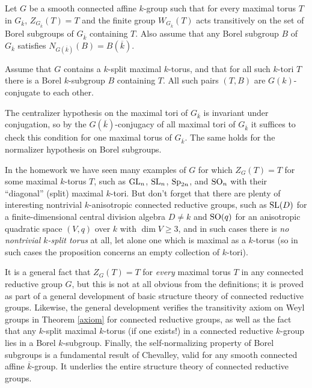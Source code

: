 \documentclass[10pt]{article}
\renewcommand{\(}{\left(}
\renewcommand{\)}{\right)}
\numberwithin{thm}{subsection}
\begin{document}
\begin{thm}\label{axiom} Let $G$ be a smooth connected affine $k$-group such that 
for every maximal torus $T$ in $G_{\overline{k}}$, $Z_{G_{\overline{k}}}(T) = T$
and the finite group $W_{G_{\overline{k}}}(T)$ acts transitively on
the set of Borel subgroups of $G_{\overline{k}}$ containing $T$.  Also assume
that any Borel subgroup $B$ of $G_{\overline{k}}$ satisfies $N_{G(\overline{k})}(B) = B(\overline{k})$.
 
 Assume that $G$ contains a $k$-split maximal $k$-torus, and
 that for all such $k$-tori $T$ 
there is a Borel $k$-subgroup $B$ containing $T$.  All such pairs $(T, B)$ are $G(k)$-conjugate to each other.
\end{thm}

The centralizer hypothesis on the maximal tori of $G_{\overline{k}}$ is invariant under
conjugation, so by the $G(\overline{k})$-conjugacy of all maximal tori of $G_{\overline{k}}$
it suffices to check this condition for one maximal torus of $G_{\overline{k}}$.  The same
holds for the normalizer hypothesis on Borel subgroups.

\begin{remark}
In the homework we have seen many examples of $G$ for which $Z_G(T) = T$ for some
maximal $k$-torus $T$, such as ${\rm{GL}}_n$, ${\rm{SL}}_n$, ${\rm{Sp}}_{2n}$,
and ${\rm{SO}}_n$ with their ``diagonal''  (split) maximal $k$-tori.   But don't forget that there
are plenty of interesting nontrivial $k$-anisotropic connected reductive groups,
such as ${\rm{SL}}(D)$ for a finite-dimensional central division algebra $D \ne k$ and
${\rm{SO}}(q)$ for an anisotropic quadratic space $(V,q)$ over $k$ with $\dim V \ge 3$,
and in such cases there is {\em no nontrivial $k$-split torus} at all, let alone one which is maximal
as a $k$-torus (so in such cases the proposition concerns an empty collection of
$k$-tori).  
\end{remark}

\begin{remark}\label{ver}
 It is a general fact that $Z_G(T) = T$ for {\em every} maximal torus $T$ in any connected
reductive group $G$, but this is not at all obvious from the definitions; it is proved 
as part of a general development of basic structure theory of connected reductive groups.
Likewise, the general development verifies the transitivity axiom on Weyl groups in Theorem \ref{axiom} for connected reductive groups,
as well as the fact that any $k$-split maximal $k$-torus (if one exists!) in a connected
reductive $k$-group lies in a Borel $k$-subgroup. 
Finally, the self-normalizing
property of Borel subgroups is a fundamental result of Chevalley, valid for any smooth connected
affine $\overline{k}$-group.  It underlies the entire structure theory of connected reductive groups.
\end{remark}
\end{document}
